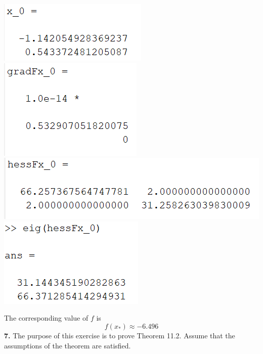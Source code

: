 \documentclass{article}
\begin{document}
\begin{center}
    \includegraphics[scale = 0.9]{prob3_3_min}
    \includegraphics[scale = 0.9]{prob3_3_grad}
    \newline\newline\newline
    \includegraphics[scale = 0.9]{prob3_3_hess}
    \includegraphics[scale = 0.9]{prob3_3_hesseig}
    \newline\newline
\end{center}
The corresponding value of $f$ is
\[f(x_*) \approx -6.496\]
\newline\newline
\textbf{7.} The purpose of this exercise is to prove Theorem 11.2. Assume that the assumptions of the theorem are satisfied.
\end{document}
